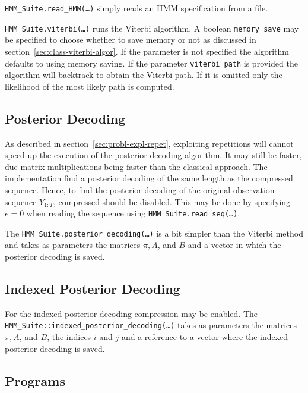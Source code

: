 \texttt{HMM\_Suite.read\_HMM(\dots)} simply reads an HMM specification from a
file.

\texttt{HMM\_Suite.viterbi(\dots)} runs the Viterbi algorithm. A boolean
\texttt{memory\_save} may be specified to choose whether to save memory or not
as discussed in section~\ref{sec:class-viterbi-algor}. If the parameter is not
specified the algorithm defaults to using memory saving. If the parameter
\texttt{viterbi\_path} is provided the algorithm will backtrack to obtain the
Viterbi path. If it is omitted only the likelihood of the most likely path is
computed.

\subsection{Posterior Decoding}

As described in section~\ref{sec:probl-expl-repet}, exploiting repetitions will
cannot speed up the execution of the posterior decoding algorithm. It may still
be faster, due matrix multiplications being faster than the classical
approach. The implementation find a posterior decoding of the same length as
the compressed sequence. Hence, to find the posterior decoding of the original
observation sequence $Y_{1:T}$, compressed should be disabled. This may be done by
specifying $e = 0$ when reading the sequence using
\texttt{HMM\_Suite.read\_seq(\dots)}.

The \texttt{HMM\_Suite.posterior\_decoding(\dots)} is a bit simpler than the
Viterbi method and takes as parameters the matrices $\pi, A$, and $B$ and a
vector in which the posterior decoding is saved.

\subsection{Indexed Posterior Decoding}

For the indexed posterior decoding compression may be enabled. The
\texttt{HMM\_Suite::indexed\_posterior\_decoding(\dots)} takes as parameters the
matrices $\pi, A$, and $B$, the indices $i$ and $j$ and a reference to a vector
where the indexed posterior decoding is saved.

\subsection{Programs}


